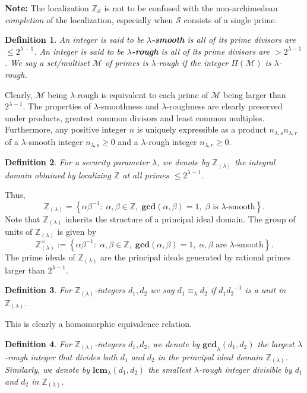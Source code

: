 \documentclass[11pt, lettersize, notitlepage, leqno, footskip=0.6cm]{article}
\newcommand{\bz}{\mathbb Z}
\newcommand{\eqlam}{\equiv_{\lam}}
\newcommand{\mc}{\mathcal}
\newcommand{\mbf}{\mathbf}
\newcommand{\al}{\alpha}
\newcommand{\be}{\beta}
\newcommand{\lam}{\lambda}
\newcommand{\lamb}{\lambda}
\newcommand{\bzlam}{\bz_{(\lam)}}
\newcommand{\mcM}{\mc{M}}
\newcommand{\vs}{\vspace{-0.15cm}}
\newcommand{\noin}{\noindent}
\newcommand{\LCM}{\mbf{lcm}}
\newcommand{\GCD}{\mbf{gcd}}
\newtheorem{Def}{Definition}[section]
\numberwithin{equation}{section}
\begin{document}
\noin \textbf{Note:} The localization $\bz_{\mc{S}}$ is not to be confused with the non-archimedean \textit{completion} of the localization, especially when $\mc{S}$ consists of a single prime.


\begin{Def} An integer is said to be \textbf{$\lamb$-smooth} is all of its prime divisors are $\leq 2^{\lamb-1}$. An integer is said to be \textbf{$\lamb$-rough} is all of its prime divisors are $> 2^{\lam-1}$. We say a set/multiset $\mcM$ of primes is $\lam$-rough if the integer $\Pi(\mcM)$ is $\lam$-rough. \end{Def}

Clearly, $\mcM$ being $\lam$-rough is equivalent to each prime of $\mcM$ being larger than $2^{\lam-1}$. The properties of $\lamb$-smoothness and $\lamb$-roughness are clearly preserved under products, greatest common divisors and least common multiples. Furthermore, any positive integer $n$ is uniquely expressible as a product $n_{{\lam,s}}n_{{\lam,r}}$ of a $\lam$-smooth integer $n_{{\lam,s}}\geq 0$ and a $\lam$-rough integer $n_{{\lam,r}}\geq 0$.

\begin{Def} For a security parameter $\lamb$, we denote by $\bz_{(\lamb)}$ the integral domain obtained by localizing $\bz$ at all primes $\leq 2^{\lamb-1}$. \end{Def}

\noindent Thus, \vs $$\bz_{(\lamb)} = \left\{{\al}{\be}^{-1}:\; \al,\be\in\bz,\;\GCD(\al,\be) = 1,\; \be \text{ is } \lamb\text{-smooth}\right\}.$$ Note that $\bz_{(\lamb)}$ inherits the structure of a principal ideal domain. The group of units of $\bzlam$ is given by $$\bzlam^{\times} := \left\{{\al}{\be}^{-1}:\; \al,\be\in\bz,\;\GCD(\al,\be) = 1,\; \al, \be \text{ are } \lamb\text{-smooth}\right\}. $$ The prime ideals of $\bz_{(\lamb)}$ are the principal ideals generated by rational primes larger than $2^{\lam-1}$.

\begin{Def} For $\bzlam$-integers $d_1,d_2$ we say $d_1\eqlam d_2$ if ${d_1}{d_2}^{-1}$ is a unit in $\bzlam$.\end{Def}

\noin This is clearly a homomorphic equivalence relation.

\begin{Def} For $\bzlam$-integers $d_1,d_2$, we denote by $\GCD_{\lam}(d_1,d_2)$ the largest $\lam$-rough integer that divides both $d_1$ and $d_2$ in the principal ideal domain $\bzlam$. Similarly, we denote by $\LCM_{\lam}(d_1,d_2)$ the smallest $\lam$-rough integer divisible by $d_1$ and $d_2$ in $\bzlam$.\end{Def}
\end{document}
